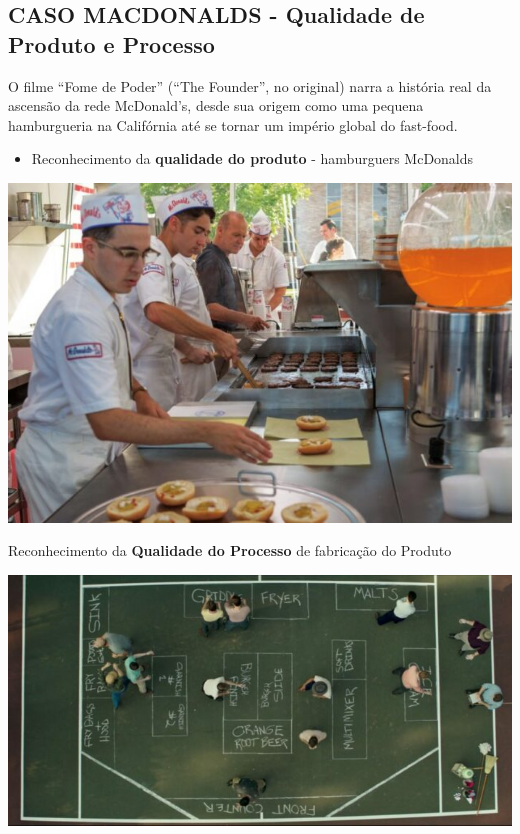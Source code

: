 \documentclass[
]{book}
\providecommand{\tightlist}{%
  \setlength{\itemsep}{0pt}\setlength{\parskip}{0pt}}
\begin{document}
\subsection{CASO MACDONALDS - Qualidade de Produto e Processo}\label{caso-macdonalds---qualidade-de-produto-e-processo}

O filme ``Fome de Poder'' (``The Founder'', no original) narra a história real da ascensão da rede McDonald's, desde sua origem como uma pequena hamburgueria na Califórnia até se tornar um império global do fast-food.

\begin{itemize}
\tightlist
\item
  Reconhecimento da \textbf{qualidade do produto} - hamburguers McDonalds
\end{itemize}

\includegraphics{images/mac-donalds/cozinha-mac.jpg}

Reconhecimento da \textbf{Qualidade do Processo} de fabricação do Produto

\includegraphics{images/mac-donalds/modelo-mac.jpg}
\end{document}
